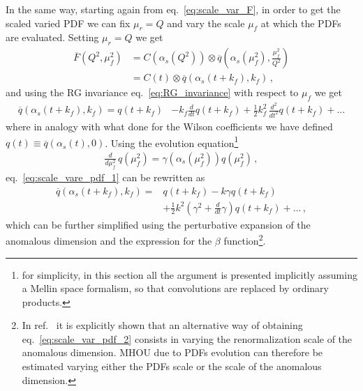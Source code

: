 %
In the same way, starting again from eq.~\eqref{eq:scale_var_F}, in order to get the 
scaled varied PDF we can fix $\mu_r=Q$
and vary the scale $\mu_f$ at which the PDFs are evaluated. Setting $\mu_r=Q$ we get 
\begin{align}
    \overline{F}\left(Q^2,\mu_f^2\right)& = 
    C\left(\alpha_s\left(Q^2\right)\right)\otimes 
    \overline{q}\left(\alpha_s\left(\mu_f^2\right),\frac{\mu_f^2}{Q^2}\right) \nonumber \\
    &=C\left(t\right)\otimes \overline{q}\left(\alpha_s\left(t+k_f\right),k_f\right)\,,
\end{align}
and using the RG invariance eq.~\eqref{eq:RG_invariance} with respect to $\mu_f$ we get 
\begin{align}
    \label{eq:scale_vare_pdf_1}
    \overline{q}\left(\alpha_s\left(t+k_f\right),k_f\right) = q\left(t+k_f\right) &-  k_f\frac{d}{dt}q\left(t+k_f\right) 
    + \frac{1}{2} k_f^2\,\frac{d^2}{dt^2}q\left(t+k_f\right) + ...
\end{align}
where in analogy with what done for the Wilson coefficients we have defined 
$q\left(t\right) \equiv \overline{q}\left(\alpha_s\left(t\right),0\right)$.
Using the evolution equation\footnote{for simplicity, in
this section all the argument is presented implicitly assuming a Mellin space formalism, so that
convolutions are replaced by ordinary products.}
\begin{align}
    \frac{d}{d\mu_f^2}\, q\left(\mu_f^2\right) = \gamma\left(\alpha_s\left(\mu_f^2\right)\right)q\left(\mu_f^2\right)\,,
\end{align}
eq.~\eqref{eq:scale_vare_pdf_1} can be rewritten as 
\begin{align}
    \label{eq:scale_var_pdf_2}
    \overline{q}\left(\alpha_s\left(t+k_f\right),k_f\right) = &q\left(t+k_f\right) - k\gamma q\left(t+k_f\right) \nonumber\\
    &+ \frac{1}{2}k^2\left(\gamma^2 + \frac{d}{dt}\gamma\right)q\left(t+k_f\right) + ...\,,
\end{align}
which can be further simplified using the perturbative expansion of the anomalous dimension
and the expression for the $\beta$ function\footnote{In ref.~\cite{AbdulKhalek:2019ihb} it is explicitly shown that an 
alternative way of obtaining eq.~\eqref{eq:scale_var_pdf_2} consists in varying the renormalization scale of the anomalous dimension.
MHOU due to PDFs evolution can therefore be estimated varying either the PDFs scale or the scale of the anomalous dimension.}.

